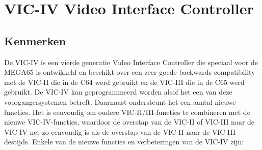 \chapter{VIC-IV Video Interface Controller}
\label{cha:viciv}

\section{Kenmerken}De VIC-IV is een vierde generatie Video Interface Controller die speciaal voor de MEGA65 is ontwikkeld en beschikt over een zeer goede backwards compatibility met de VIC-II die in de C64 werd gebruikt en de VIC-III die in de C65 werd gebruikt. De VIC-IV kan geprogrammeerd worden alsof het een van deze voorgangersystemen betreft. Daarnaast ondersteunt het een aantal nieuwe functies. Het is eenvoudig om oudere VIC-II/III-functies te combineren met de nieuwe VIC-IV-functies, waardoor de overstap van de VIC-II of VIC-III naar de VIC-IV net zo eenvoudig is als de overstap van de VIC-II naar de VIC-III destijds. Enkele van de nieuwe functies en verbeteringen van de VIC-IV zijn:

